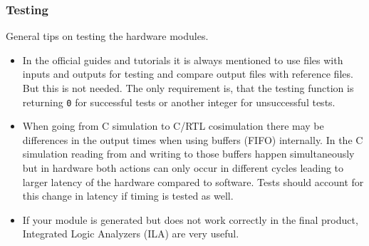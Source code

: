 \subsubsection{Testing}
General tips on testing the hardware modules.
\begin{itemize}
  \item In the official guides and tutorials it is always mentioned to use files with inputs and outputs for testing and compare output files with reference files. But this is not needed. The only requirement is, that the testing function is returning \texttt{0} for successful tests or another integer for unsuccessful tests.
  \item When going from C simulation to C/RTL cosimulation there may be differences in the output times when using buffers (FIFO) internally. In the C simulation reading from and writing to those buffers happen simultaneously but in hardware both actions can only occur in different cycles leading to larger latency of the hardware compared to software. Tests should account for this change in latency if timing is tested as well.
  \item If your module is generated but does not work correctly in the final product, Integrated Logic Analyzers (ILA) are very useful.
\end{itemize}

